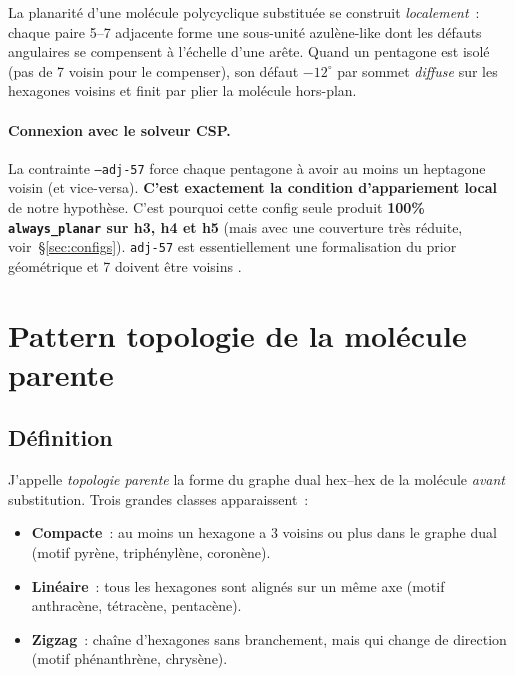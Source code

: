 \documentclass[11pt,a4paper]{article}
\begin{document}
\begin{hypothese}
La planarité d'une molécule polycyclique substituée se construit \emph{localement}~: chaque paire 5--7 adjacente forme une sous-unité azulène-like dont les défauts angulaires se compensent à l'échelle d'une arête. Quand un pentagone est isolé (pas de 7 voisin pour le compenser), son défaut $-12^\circ$ par sommet \emph{diffuse} sur les hexagones voisins et finit par plier la molécule hors-plan.
\end{hypothese}

\paragraph{Connexion avec le solveur CSP.}
La contrainte \texttt{--adj-57} force chaque pentagone à avoir au moins un heptagone voisin (et vice-versa). \textbf{C'est exactement la condition d'appariement local} de notre hypothèse. C'est pourquoi cette config seule produit \textbf{100\% \texttt{always\_planar} sur h3, h4 et h5} (mais avec une couverture très réduite, voir~\S\ref{sec:configs}). \texttt{adj-57} est essentiellement une formalisation du \og prior \fg{} géométrique  et 7 doivent être voisins \fg{}.

\section{Pattern \og topologie de la molécule parente \fg{}}\label{sec:topo}

\subsection{Définition}

J'appelle \emph{topologie parente} la forme du graphe dual hex--hex de la molécule \emph{avant} substitution. Trois grandes classes apparaissent~:
\begin{itemize}[leftmargin=2em,itemsep=0.2em]
  \item \textbf{Compacte}~: au moins un hexagone a 3 voisins ou plus dans le graphe dual (motif pyrène, triphénylène, coronène).
  \item \textbf{Linéaire}~: tous les hexagones sont alignés sur un même axe (motif anthracène, tétracène, pentacène).
  \item \textbf{Zigzag}~: chaîne d'hexagones sans branchement, mais qui change de direction (motif phénanthrène, chrysène).
\end{itemize}
\end{document}
